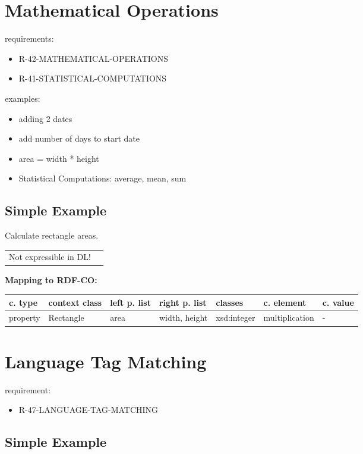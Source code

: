 \documentclass{llncs}
\newenvironment{gcotable}{
  \scriptsize
  \sffamily
  \vspace{0cm}
	\begin{center}
	\textbf{\vspace{0.4cm}Mapping to RDF-CO:} \\
  \begin{tabular}{l|l|l|l|l|l|l}
	\hline
  \textbf{c. type} & \textbf{context class} & \textbf{left p. list} & \textbf{right p. list} & \textbf{classes} & \textbf{c. element} & \textbf{c. value} \\
  \hline

}{
  \hline
  \end{tabular}
	\end{center}
}
\newenvironment{DL}{
  \vspace{0cm}
	\begin{center}
  \begin{tabular}{r l}

}{
  \end{tabular}
	\end{center}
}
\begin{document}
\section{Mathematical Operations}

requirements:

\begin{itemize}
	\item R-42-MATHEMATICAL-OPERATIONS
	\item R-41-STATISTICAL-COMPUTATIONS
\end{itemize}



examples:

\begin{itemize}
	\item adding 2 dates
	\item add number of days to start date
	\item area = width * height
	\item Statistical Computations: average, mean, sum
\end{itemize}

\subsection{Simple Example}

Calculate rectangle areas.

\begin{DL}
Not expressible in DL!
\end{DL}

\begin{gcotable}
property & Rectangle & area & width, height & xsd:integer & multiplication & - \\
\end{gcotable}

\section{Language Tag Matching}

requirement:

\begin{itemize}
	\item R-47-LANGUAGE-TAG-MATCHING
\end{itemize}

\subsection{Simple Example}
\end{document}
